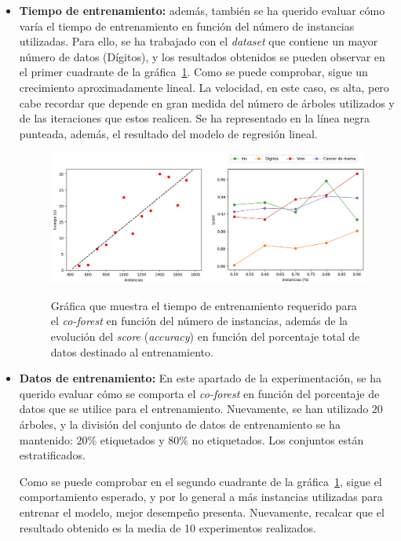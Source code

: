 \begin{itemize}
	\item \textbf{Tiempo de entrenamiento:} además, también se ha querido evaluar cómo varía el tiempo de entrenamiento en función del número de instancias utilizadas. Para ello, se ha trabajado con el \textit{dataset} que contiene un mayor número de datos (Dígitos), y los resultados obtenidos se pueden observar en el primer cuadrante de la gráfica~\ref{cf:cf_time-percentage}. Como se puede comprobar, sigue un crecimiento aproximadamente lineal. La velocidad, en este caso, es alta, pero cabe recordar que depende en gran medida del número de árboles utilizados y de las iteraciones que estos realicen. Se ha representado en la línea negra punteada, además, el resultado del modelo de regresión lineal.

\begin{figure}[h]
	\caption[\textit{Co-Forest}: resultados (tiempo-porcentaje)]{Gráfica que muestra el tiempo de entrenamiento requerido para el \textit{co-forest} en función del número de instancias, además de la evolución del \textit{score} (\textit{accuracy}) en función del porcentaje total de datos destinado al entrenamiento.}
	\centering
	\includegraphics[scale=0.4]{../img/memoria/5_coforest_time-percentage}
	\label{cf:cf_time-percentage}
\end{figure}


	\item \textbf{Datos de entrenamiento:} En este apartado de la experimentación, se ha querido evaluar cómo se comporta el \textit{co-forest} en función del porcentaje de datos que se utilice para el entrenamiento. Nuevamente, se han utilizado  $20$ árboles, y la división del conjunto de datos de entrenamiento se ha mantenido: $20\%$ etiquetados y $80\%$ no etiquetados. Los conjuntos están estratificados.
	
	Como se puede comprobar en el segundo cuadrante de la gráfica~\ref{cf:cf_time-percentage}, sigue el comportamiento esperado, y por lo general a más instancias utilizadas para entrenar el modelo, mejor desempeño presenta. Nuevamente, recalcar que el resultado obtenido es la media de 10 experimentos realizados.
	

\end{itemize}

